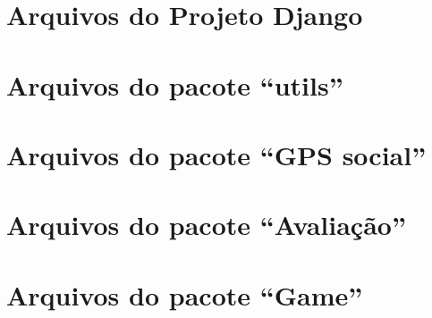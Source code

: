 \section{Arquivos do Projeto Django}



\section{Arquivos do pacote ``utils''}





\section{Arquivos do pacote ``GPS social''}





\section{Arquivos do pacote ``Avaliação''}





\section{Arquivos do pacote ``Game''}





